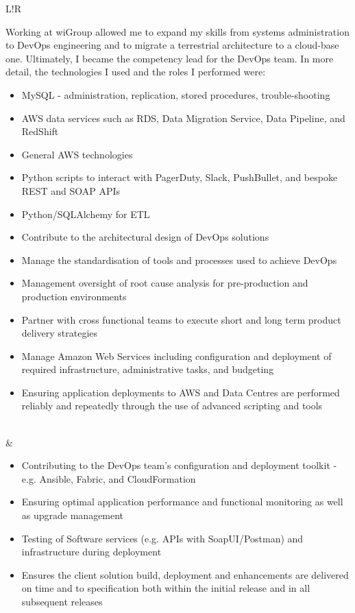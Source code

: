 \documentclass[10pt]{article}
\newcommand\VRule{\color{lightgray}\vrule width 0.9pt}
\begin{document}
\begin{supertabular}{L!{\VRule}R}
\begin{minipage}[ht]{0.50\textwidth}
\end{minipage}
Working at wiGroup allowed me to expand my skills from systems administration to DevOps engineering and to migrate a terrestrial architecture to a cloud-base one. Ultimately, I became the competency lead for the DevOps team. In more detail, the technologies I used and the roles I performed were:
\begin{itemize}[topsep=6pt,parsep=0pt,partopsep=0pt]
\item MySQL - administration, replication, stored procedures, trouble-shooting
\item AWS data services such as RDS, Data Migration Service, Data Pipeline, and RedShift
\item General AWS technologies
\item Python scripts to interact with PagerDuty, Slack, PushBullet, and bespoke REST and SOAP APIs
\item Python/SQLAlchemy for ETL
\item Contribute to the architectural design of DevOps solutions
\item Manage the standardisation of tools and processes used to achieve DevOps
\item Management oversight of root cause analysis for pre-production and production environments
\item Partner with cross functional teams to execute short and long term product delivery strategies
\item Manage Amazon Web Services including configuration and deployment of required 
infrastructure, administrative tasks, and budgeting
\item Ensuring application deployments to AWS and Data Centres are performed reliably and repeatedly through the use of advanced scripting and tools
\end{itemize}\\
&\begin{itemize}[topsep=0pt,parsep=0pt,partopsep=0pt]
\item Contributing to the DevOps team's configuration and deployment toolkit - e.g. Ansible, Fabric, and CloudFormation
\item Ensuring optimal application performance and functional monitoring as well as upgrade management
\item Testing of Software services (e.g. APIs with SoapUI/Postman) and infrastructure during deployment
\item Ensures the client solution build, deployment and enhancements are delivered on time and to specification both within the initial release and in all subsequent releases

\end{itemize}
\end{supertabular}
\end{document}
